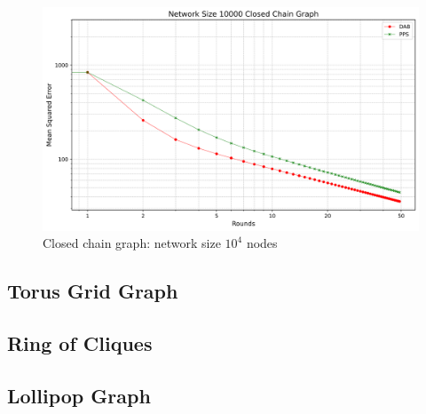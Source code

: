 \begin{figure}[H]
    \centering
    \includegraphics[scale=0.5]{figures/closedChainSimulations/DAB_vs_PPS_CCG_r50_n10000.png}
    \caption{Closed chain graph: network size $10^{4}$ nodes}
    \label{fig:10000ChainGraph}
\end{figure}

\subsection{Torus Grid Graph}
\subsection{Ring of Cliques}
\subsection{Lollipop Graph}
